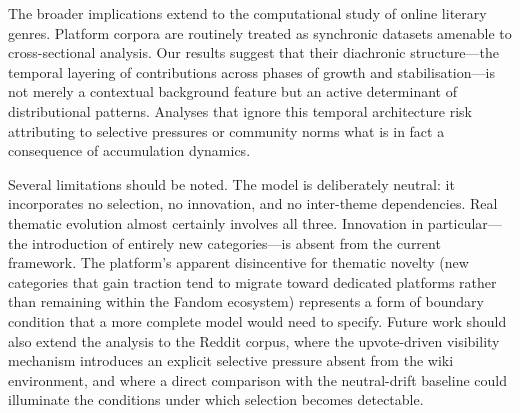 \documentclass{anthology-ch}         %
\begin{document}
The broader implications extend to the computational study of online literary genres. Platform corpora are routinely treated as synchronic datasets amenable to cross-sectional analysis. Our results suggest that their diachronic structure---the temporal layering of contributions across phases of growth and stabilisation---is not merely a contextual background feature but an active determinant of distributional patterns. Analyses that ignore this temporal architecture risk attributing to selective pressures or community norms what is in fact a consequence of accumulation dynamics.

Several limitations should be noted. The model is deliberately neutral: it incorporates no selection, no innovation, and no inter-theme dependencies. Real thematic evolution almost certainly involves all three. Innovation in particular---the introduction of entirely new categories---is absent from the current framework. The platform's apparent disincentive for thematic novelty (new categories that gain traction tend to migrate toward dedicated platforms rather than remaining within the Fandom ecosystem) represents a form of boundary condition that a more complete model would need to specify. Future work should also extend the analysis to the Reddit corpus, where the upvote-driven visibility mechanism introduces an explicit selective pressure absent from the wiki environment, and where a direct comparison with the neutral-drift baseline could illuminate the conditions under which selection becomes detectable.
 

\printbibliography
\end{document}
